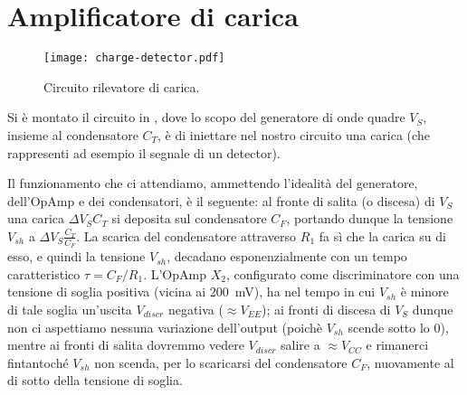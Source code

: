 \section{Amplificatore di carica}

\begin{figure}[h]
	\centering
	\texttt{[image: charge-detector.pdf]}
	\caption{Circuito rilevatore di carica.}
	\label{f:circ_qdet}
\end{figure}

Si è montato il circuito in , dove lo scopo del generatore di onde quadre $V_S$, insieme al condensatore $C_T$, è di iniettare nel nostro circuito una carica (che rappresenti ad esempio il segnale di un detector).

Il funzionamento che ci attendiamo, ammettendo l'idealità del generatore, dell'OpAmp e dei condensatori, è il seguente: al fronte di salita (o discesa) di $V_S$ una carica $\Delta V_S C_T$ si deposita sul condensatore $C_F$, portando dunque la tensione $V_{sh}$ a $\Delta V_S \frac{C_T}{C_F}$. La scarica del condensatore attraverso $R_1$ fa sì che la carica su di esso, e quindi la tensione $V_{sh}$, decadano esponenzialmente con un tempo caratteristico $\tau = C_F / R_1$. L'OpAmp $X_2$, configurato come discriminatore con una tensione di soglia positiva (vicina ai \SI{200}{\mV}), ha nel tempo in cui $V_{sh}$ è minore di tale soglia un'uscita $V_{discr}$ negativa ($\approx V_{EE}$); ai fronti di discesa di $V_S$ dunque non ci aspettiamo nessuna variazione dell'output (poichè $V_{sh}$ scende sotto lo 0), mentre ai fronti di salita dovremmo vedere $V_{discr}$ salire a $\approx V_{CC}$ e rimanerci fintantoché $V_{sh}$ non scenda, per lo scaricarsi del condensatore $C_F$, nuovamente al di sotto della tensione di soglia.
